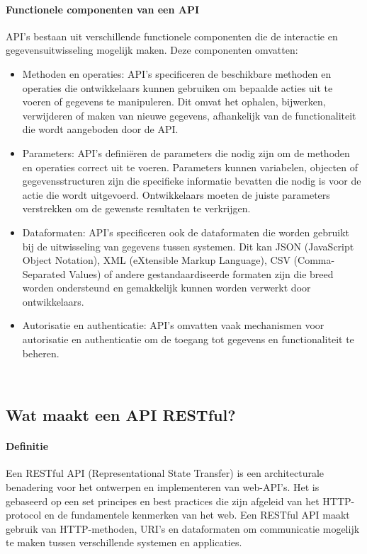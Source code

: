 \paragraph{Functionele componenten van een API}
API's bestaan uit verschillende functionele componenten die de interactie en gegevensuitwisseling mogelijk maken. Deze componenten omvatten:
\begin{itemize}
    \item Methoden en operaties: API's specificeren de beschikbare methoden en operaties die ontwikkelaars kunnen gebruiken om bepaalde acties uit te voeren of gegevens te manipuleren. Dit omvat het ophalen, bijwerken, verwijderen of maken van nieuwe gegevens, afhankelijk van de functionaliteit die wordt aangeboden door de API.
    \item Parameters: API's definiëren de parameters die nodig zijn om de methoden en operaties correct uit te voeren. Parameters kunnen variabelen, objecten of gegevensstructuren zijn die specifieke informatie bevatten die nodig is voor de actie die wordt uitgevoerd. Ontwikkelaars moeten de juiste parameters verstrekken om de gewenste resultaten te verkrijgen.
    \item Dataformaten: API's specificeren ook de dataformaten die worden gebruikt bij de uitwisseling van gegevens tussen systemen. Dit kan JSON (JavaScript Object Notation), XML (eXtensible Markup Language), CSV (Comma-Separated Values) of andere gestandaardiseerde formaten zijn die breed worden ondersteund en gemakkelijk kunnen worden verwerkt door ontwikkelaars.
    \item Autorisatie en authenticatie: API's omvatten vaak mechanismen voor autorisatie en authenticatie om de toegang tot gegevens en functionaliteit te beheren.
\end{itemize} \autocite{Arellano2021}
\\
\subsection{Wat maakt een API RESTful?}
\label{sec:Wat maakt een API RESTful}
\paragraph{Definitie}
Een RESTful API (Representational State Transfer) is een architecturale benadering voor het ontwerpen en implementeren van web-API's. Het is gebaseerd op een set principes en best practices die zijn afgeleid van het HTTP-protocol en de fundamentele kenmerken van het web. Een RESTful API maakt gebruik van HTTP-methoden, URI's en dataformaten om communicatie mogelijk te maken tussen verschillende systemen en applicaties. \autocite{Gillis2020}
